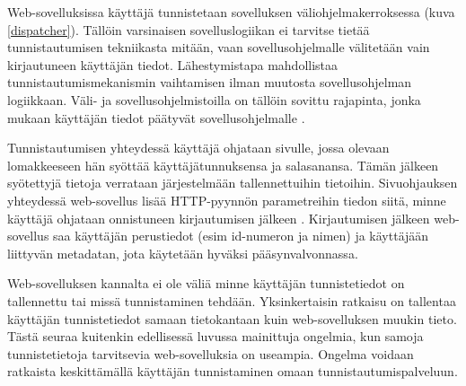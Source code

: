 Web-sovelluksissa käyttäjä tunnistetaan sovelluksen väliohjelmakerroksessa (kuva \ref{dispatcher}). Tällöin varsinaisen sovelluslogiikan ei tarvitse tietää tunnistautumisen tekniikasta mitään, vaan sovellusohjelmalle välitetään vain kirjautuneen käyttäjän tiedot. Lähestymistapa mahdollistaa tunnistautumismekanismin vaihtamisen ilman muutosta sovellusohjelman logiikkaan. Väli- ja sovellusohjelmistoilla on tällöin sovittu rajapinta, jonka mukaan käyttäjän tiedot päätyvät sovellusohjelmalle \cite{django}.

Tunnistautumisen yhteydessä käyttäjä ohjataan sivulle, jossa olevaan lomakkeeseen hän syöttää käyttäjätunnuksensa ja salasanansa. Tämän jälkeen syötettyjä tietoja verrataan järjestelmään tallennettuihin tietoihin. Sivuohjauksen yhteydessä web-sovellus lisää HTTP-pyynnön parametreihin tiedon siitä, minne käyttäjä ohjataan onnistuneen kirjautumisen jälkeen \cite{oauth2_0}. Kirjautumisen jälkeen web-sovellus saa käyttäjän perustiedot (esim id-numeron ja nimen) ja käyttäjään liittyvän metadatan, jota käytetään hyväksi pääsynvalvonnassa.

Web-sovelluksen kannalta ei ole väliä minne käyttäjän tunnistetiedot on tallennettu tai missä tunnistaminen tehdään. Yksinkertaisin ratkaisu on tallentaa käyttäjän tunnistetiedot samaan tietokantaan kuin web-sovelluksen muukin tieto. Tästä seuraa kuitenkin edellisessä luvussa mainittuja ongelmia, kun samoja tunnistetietoja tarvitsevia web-sovelluksia on useampia. Ongelma voidaan ratkaista keskittämällä käyttäjän tunnistaminen omaan tunnistautumispalveluun.